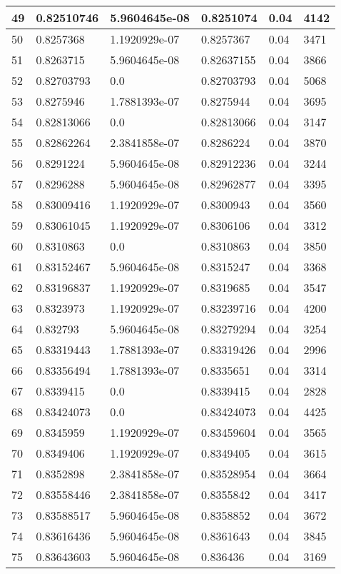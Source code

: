 \begin{longtable}{|l|l|l|l|l|l|}
49 & 0.82510746 & 5.9604645e-08 & 0.8251074 & 0.04 & 4142 \\ \hline 
50 & 0.8257368 & 1.1920929e-07 & 0.8257367 & 0.04 & 3471 \\ \hline 
51 & 0.8263715 & 5.9604645e-08 & 0.82637155 & 0.04 & 3866 \\ \hline 
52 & 0.82703793 & 0.0 & 0.82703793 & 0.04 & 5068 \\ \hline 
53 & 0.8275946 & 1.7881393e-07 & 0.8275944 & 0.04 & 3695 \\ \hline 
54 & 0.82813066 & 0.0 & 0.82813066 & 0.04 & 3147 \\ \hline 
55 & 0.82862264 & 2.3841858e-07 & 0.8286224 & 0.04 & 3870 \\ \hline 
56 & 0.8291224 & 5.9604645e-08 & 0.82912236 & 0.04 & 3244 \\ \hline 
57 & 0.8296288 & 5.9604645e-08 & 0.82962877 & 0.04 & 3395 \\ \hline 
58 & 0.83009416 & 1.1920929e-07 & 0.8300943 & 0.04 & 3560 \\ \hline 
59 & 0.83061045 & 1.1920929e-07 & 0.8306106 & 0.04 & 3312 \\ \hline 
60 & 0.8310863 & 0.0 & 0.8310863 & 0.04 & 3850 \\ \hline 
61 & 0.83152467 & 5.9604645e-08 & 0.8315247 & 0.04 & 3368 \\ \hline 
62 & 0.83196837 & 1.1920929e-07 & 0.8319685 & 0.04 & 3547 \\ \hline 
63 & 0.8323973 & 1.1920929e-07 & 0.83239716 & 0.04 & 4200 \\ \hline 
64 & 0.832793 & 5.9604645e-08 & 0.83279294 & 0.04 & 3254 \\ \hline 
65 & 0.83319443 & 1.7881393e-07 & 0.83319426 & 0.04 & 2996 \\ \hline 
66 & 0.83356494 & 1.7881393e-07 & 0.8335651 & 0.04 & 3314 \\ \hline 
67 & 0.8339415 & 0.0 & 0.8339415 & 0.04 & 2828 \\ \hline 
68 & 0.83424073 & 0.0 & 0.83424073 & 0.04 & 4425 \\ \hline 
69 & 0.8345959 & 1.1920929e-07 & 0.83459604 & 0.04 & 3565 \\ \hline 
70 & 0.8349406 & 1.1920929e-07 & 0.8349405 & 0.04 & 3615 \\ \hline 
71 & 0.8352898 & 2.3841858e-07 & 0.83528954 & 0.04 & 3664 \\ \hline 
72 & 0.83558446 & 2.3841858e-07 & 0.8355842 & 0.04 & 3417 \\ \hline 
73 & 0.83588517 & 5.9604645e-08 & 0.8358852 & 0.04 & 3672 \\ \hline 
74 & 0.83616436 & 5.9604645e-08 & 0.8361643 & 0.04 & 3845 \\ \hline 
75 & 0.83643603 & 5.9604645e-08 & 0.836436 & 0.04 & 3169 \\ \hline 
\end{longtable}